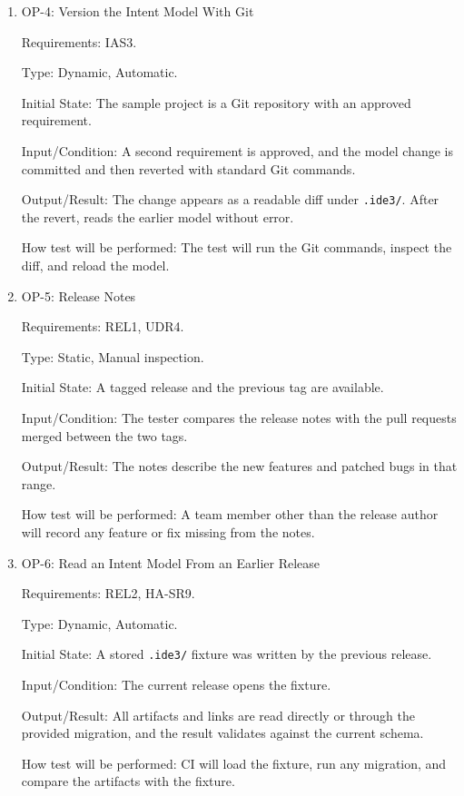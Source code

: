 \documentclass[12pt, titlepage]{article}
\begin{document}
\begin{enumerate}
Input/Condition: The tester gives the same implementation brief to each
assistant and asks it to implement the interfaces.

Output/Result: Both assistants read the handoff and produce an
implementation without any change to their configuration. Both
implementations are checked by the verification command (FR10).

How test will be performed: The tester will compare each assistant's
configuration before and after, and record the verification report for each
implementation.

\item{OP-4: Version the Intent Model With Git\\}

Requirements: IAS3.

Type: Dynamic, Automatic.

Initial State: The sample project is a Git repository with an approved
requirement.

Input/Condition: A second requirement is approved, and the model change is
committed and then reverted with standard Git commands.

Output/Result: The change appears as a readable diff under \texttt{.ide3/}. After
the revert, \progname{} reads the earlier model without error.

How test will be performed: The test will run the Git commands, inspect the diff,
and reload the model.

\item{OP-5: Release Notes\\}

Requirements: REL1, UDR4.

Type: Static, Manual inspection.

Initial State: A tagged release and the previous tag are available.

Input/Condition: The tester compares the release notes with the pull requests
merged between the two tags.

Output/Result: The notes describe the new features and patched bugs in that
range.

How test will be performed: A team member other than the release author will
record any feature or fix missing from the notes.

\item{OP-6: Read an Intent Model From an Earlier Release\\}

Requirements: REL2, HA-SR9.

Type: Dynamic, Automatic.

Initial State: A stored \texttt{.ide3/} fixture was written by the previous
release.

Input/Condition: The current release opens the fixture.

Output/Result: All artifacts and links are read directly or through the provided
migration, and the result validates against the current schema.

How test will be performed: CI will load the fixture, run any migration, and
compare the artifacts with the fixture.

\end{enumerate}
\end{document}
